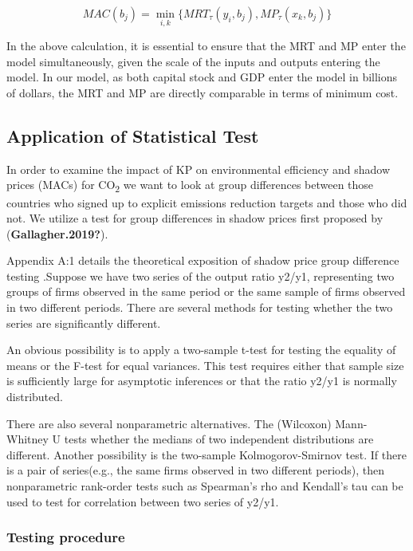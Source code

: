 \documentclass[
  letterpaper,
  DIV=11,
  numbers=noendperiod]{scrartcl}
\begin{document}
\begin{equation}
MAC(b_{j})=\displaystyle \min_{i,k}\{MRT_{\tau}(y_{i},b_{j}), MP_{\tau}(x_{k},b_{j})\} \end{equation}

In the above calculation, it is essential to ensure that the MRT and MP
enter the model simultaneously, given the scale of the inputs and
outputs entering the model. In our model, as both capital stock and GDP
enter the model in billions of dollars, the MRT and MP are directly
comparable in terms of minimum cost.

\hypertarget{application-of-statistical-test}{%
\subsection{Application of Statistical
Test}\label{application-of-statistical-test}}

In order to examine the impact of KP on environmental efficiency and
shadow prices (MACs) for CO\textsubscript{2} we want to look at group
differences between those countries who signed up to explicit emissions
reduction targets and those who did not. We utilize a test for group
differences in shadow prices first proposed by
(\textbf{Gallagher.2019?}).

Appendix A:1 details the theoretical exposition of shadow price group
difference testing .Suppose we have two series of the output ratio
y2/y1, representing two groups of firms observed in the same period or
the same sample of firms observed in two different periods. There are
several methods for testing whether the two series are significantly
different.

An obvious possibility is to apply a two-sample t-test for testing the
equality of means or the F-test for equal variances. This test requires
either that sample size is sufficiently large for asymptotic inferences
or that the ratio y2/y1 is normally distributed.

There are also several nonparametric alternatives. The (Wilcoxon)
Mann-Whitney U tests whether the medians of two independent
distributions are different. Another possibility is the two-sample
Kolmogorov-Smirnov test. If there is a pair of series(e.g., the same
firms observed in two different periods), then nonparametric rank-order
tests such as Spearman's rho and Kendall's tau can be used to test for
correlation between two series of y2/y1.

\hypertarget{testing-procedure}{%
\subsubsection{Testing procedure}\label{testing-procedure}}
\end{document}
